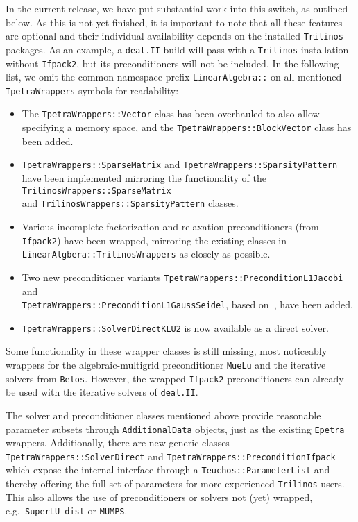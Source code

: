 \documentclass{ansarticle-preprint}
\newcommand{\specialword}[1]{\texttt{#1}}
\newcommand{\dealii}{{\specialword{deal.II}}\xspace}
\newcommand{\trilinos}{{\specialword{Trilinos}}\xspace}
\begin{document}
In the current release, we have put substantial work into this switch,
as outlined below. As this is not yet finished, it is important to note that 
all these features are optional and their individual availability
depends on the installed \trilinos{} packages. 
As an example, a \dealii{} build will pass with a \trilinos{} installation 
without \texttt{Ifpack2}, but its preconditioners will not be included.
In the following list, we omit the common namespace prefix
\texttt{LinearAlgebra::} on all mentioned
\texttt{TpetraWrappers} symbols for readability:
\begin{itemize}
  \item The \texttt{TpetraWrappers::Vector} class has been overhauled to also allow specifying
    a memory space, and the \texttt{TpetraWrappers::BlockVector} class has been added.
  \item \texttt{TpetraWrappers::SparseMatrix} and \texttt{TpetraWrappers::SparsityPattern} have been implemented mirroring
    the functionality of the \texttt{TrilinosWrappers::SparseMatrix} \\ and \texttt{TrilinosWrappers::SparsityPattern} classes.
  \item Various incomplete factorization and relaxation preconditioners (from \texttt{Ifpack2}) have been wrapped,
    mirroring the existing classes in \texttt{LinearAlgbera::TrilinosWrappers} as closely as possible.
  \item Two new preconditioner variants \texttt{TpetraWrappers::PreconditionL1Jacobi} and \\
    \texttt{TpetraWrappers::PreconditionL1GaussSeidel}, based on~\cite{BFKY2011}, have been added.
  \item \texttt{TpetraWrappers::SolverDirectKLU2} is now available as a direct solver.
\end{itemize}
Some functionality in these wrapper classes is still missing, 
most noticeably wrappers for the algebraic-multigrid preconditioner \texttt{MueLu}
and the iterative solvers from \texttt{Belos}.
However, the wrapped \texttt{Ifpack2} preconditioners can already be used with the iterative solvers of \dealii{}.

The solver and preconditioner classes mentioned above provide reasonable parameter subsets 
through \texttt{AdditionalData} objects, just as the existing
\texttt{Epetra} wrappers. 
Additionally, there are new generic classes \texttt{TpetraWrappers::SolverDirect} 
and \texttt{TpetraWrappers::PreconditionIfpack} which expose the internal interface through
a \texttt{Teuchos::ParameterList} and thereby offering the full set of parameters for 
more experienced \trilinos{} users. This also allows the use of preconditioners or 
solvers not (yet) wrapped, e.g.\ \texttt{SuperLU\_dist} or \texttt{MUMPS}.
\end{document}
